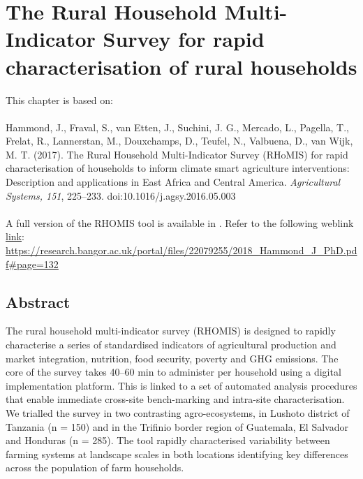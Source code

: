 \chapter[The Rural Household Multi-Indicator Survey for rapid characterisation of rural households]{The Rural Household Multi-Indicator Survey for rapid characterisation of rural households}
\label{cha:chapter2}
\vspace*{\fill}
This chapter is based on:
\\
\\
Hammond, J., Fraval, S., van Etten, J., Suchini, J. G., Mercado, L., Pagella, T., Frelat, R., Lannerstan, M., Douxchamps, D., Teufel, N., Valbuena, D., van Wijk, M. T. (2017). The Rural Household Multi-Indicator Survey (RHoMIS) for rapid characterisation of households to inform climate smart agriculture interventions: Description and applications in East Africa and Central America. \textit{Agricultural Systems, 151}, 225–233. doi:10.1016/j.agsy.2016.05.003
\\
\\
A full version of the RHOMIS tool is available in \citealp[pp.~114-131]{Hammond2018}. Refer to the following weblink \href{https://research.bangor.ac.uk/portal/files/22079255/2018_Hammond_J_PhD.pdf#page=132}{link}: \url{https://research.bangor.ac.uk/portal/files/22079255/2018_Hammond_J_PhD.pdf#page=132}
\newpage

\section{Abstract}
The rural household multi-indicator survey (RHOMIS) is designed to rapidly characterise a series of standardised indicators of agricultural production and market integration, nutrition, food security, poverty and GHG emissions. The core of the survey takes 40–60 min to administer per household using a digital implementation platform. This is linked to a set of automated analysis procedures that enable immediate cross-site bench-marking and intra-site  characterisation. We trialled the survey in two contrasting agro-ecosystems, in Lushoto district of Tanzania (n = 150) and in the Triﬁnio border region of Guatemala, El Salvador and Honduras (n = 285). The tool rapidly characterised variability between farming systems at landscape scales in both locations identifying key differences across the population of farm households.




